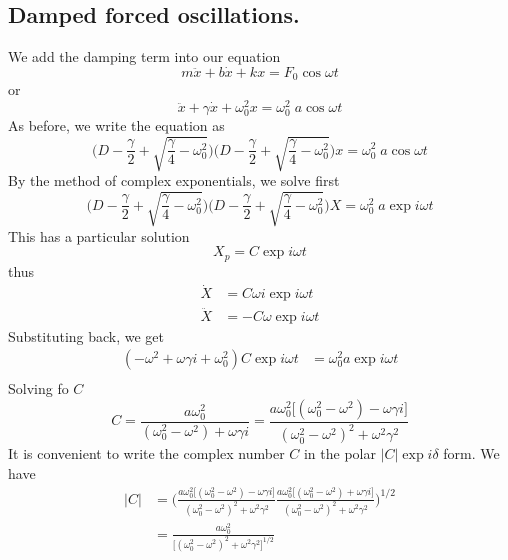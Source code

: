 \documentclass[../../../main.tex]{subfiles}
\begin{document}
\subsection{Damped forced oscillations.} We add the damping term into our equation
\begin{equation*}
    m\ddot{x}+b\dot{x}+kx=F_0 \cos \omega t
\end{equation*}
or
\begin{equation*}
    \ddot{x}+\gamma\dot{x}+\omega_0^2x=\omega_0^2\;a \cos \omega t
\end{equation*}
As before, we write the equation as 
\begin{equation*}
    \biggl(D-\frac{\gamma}{2}+\sqrt{\frac{\gamma}{4}-\omega_0^2}\biggr)\biggl(D-\frac{\gamma}{2}+\sqrt{\frac{\gamma}{4}-\omega_0^2}\biggr)x=\omega_0^2\;a \cos \omega t
\end{equation*}
By the method of complex exponentials, we solve first
\begin{equation*}
    \biggl(D-\frac{\gamma}{2}+\sqrt{\frac{\gamma}{4}-\omega_0^2}\biggr)\biggl(D-\frac{\gamma}{2}+\sqrt{\frac{\gamma}{4}-\omega_0^2}\biggr)X=\omega_0^2\;a \exp i\omega t
\end{equation*}
This has a particular solution
\begin{equation*}
    X_p=C\exp i\omega t
\end{equation*}
thus 
\begin{align*}
    \dot{X}&=C\omega i \exp i\omega t\\
    \ddot{X}&=-C\omega \exp i\omega t
\end{align*}
Substituting back, we get
\begin{align*}
    (-\omega^2+\omega \gamma i+\omega_0^2)C\exp{i\omega t}&=\omega_0^2a\exp{i\omega t}\\
\end{align*}
Solving fo $C$
\begin{equation*}
    C=\frac{a\omega_0^2}{(\omega_0^2-\omega^2)+\omega\gamma i}= \frac{a\omega_0^2 \big[(\omega_0^2-\omega^2)-\omega\gamma i\big]}{(\omega_0^2- \omega^2)^2 +\omega^2\gamma^2 }
\end{equation*}
It is convenient to write the complex number $C$ in the polar $|C|\exp i \delta$ form. We have
\begin{align*}
    |C|&=\Biggl( \frac{a\omega_0^2 \big[(\omega_0^2-\omega^2)-\omega\gamma i\big]}{(\omega_0^2- \omega^2)^2 +\omega^2\gamma^2 } \frac{a\omega_0^2 \big[(\omega_0^2-\omega^2)+\omega\gamma i\big]}{(\omega_0^2- \omega^2)^2 +\omega^2\gamma^2 }\Biggr)^{1/2}\\
    &= \frac{a\omega_0^2 }{\big[(\omega_0^2- \omega^2)^2 +\omega^2\gamma^2\big]^{1/2} }
\end{align*}
\end{document}
